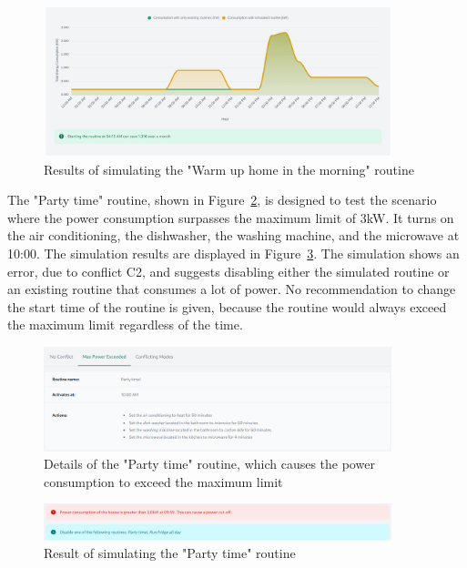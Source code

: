 \begin{figure}
    \centering
    \includegraphics[width=0.9\textwidth]{images/frontend/no_conflict_result.png}
    \caption{Results of simulating the "Warm up home in the morning" routine}
    \label{fig:frontend_no_conflict_result}
\end{figure}

The "Party time" routine, shown in Figure~\ref{fig:frontend_max_power_exceeded}, is designed to test the scenario where the power consumption surpasses the maximum limit of 3kW. It turns on the air conditioning, the dishwasher, the washing machine, and the microwave at 10:00. The simulation results are displayed in Figure~\ref{fig:frontend_max_power_exceeded_result}. The simulation shows an error, due to conflict C2, and suggests disabling either the simulated routine or an existing routine that consumes a lot of power. No recommendation to change the start time of the routine is given, because the routine would always exceed the maximum limit regardless of the time.

\begin{figure}
    \centering
    \includegraphics[width=0.9\textwidth]{images/frontend/max_power_exceeded.png}
    \caption{Details of the "Party time" routine, which causes the power consumption to exceed the maximum limit}
    \label{fig:frontend_max_power_exceeded}
\end{figure}

\begin{figure}
    \centering
    \includegraphics[width=0.9\textwidth]{images/frontend/max_power_exceeded_result.png}
    \caption{Result of simulating the "Party time" routine}
    \label{fig:frontend_max_power_exceeded_result}
\end{figure}

